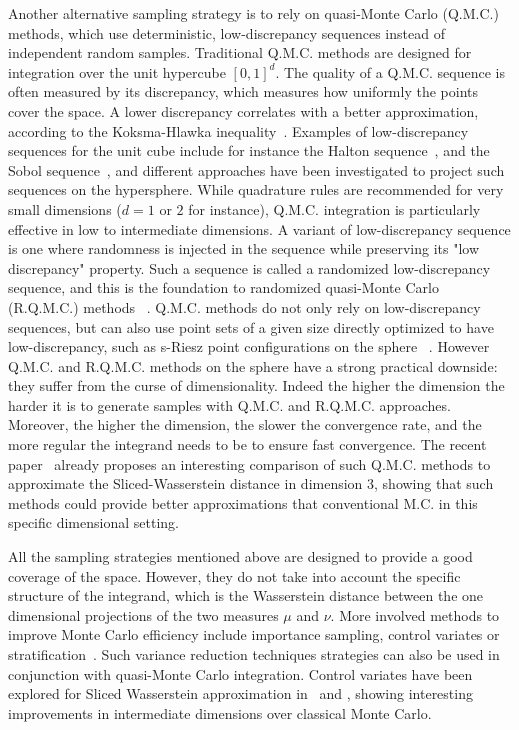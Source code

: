 Another alternative sampling strategy is to rely on quasi-Monte Carlo (Q.M.C.) methods, which use deterministic, low-discrepancy sequences instead of independent random samples. %
Traditional 
{Q.M.C.}
methods are designed for integration over the unit hypercube $[0, 1]^d$. The 
quality of a {Q.M.C.} sequence is often measured by its discrepancy, which 
measures how uniformly the points cover the space. A lower discrepancy 
correlates with a better approximation, according to the Koksma-Hlawka 
inequality~\citep{brandolini2013koksma}. Examples of low-discrepancy sequences 
for the unit cube include for instance the Halton 
sequence~\citep{halton1964algorithm},  and the Sobol 
sequence~\citep{sobol1967distribution}, and different approaches have been 
investigated to project such sequences on the hypersphere. While quadrature 
rules are recommended for very small dimensions ($d = 1$ or $2$ for instance), 
{Q.M.C.} integration is particularly effective in low to intermediate 
dimensions. A variant of low-discrepancy sequence is one where randomness is 
injected in the sequence while preserving its "low discrepancy" property. Such a 
sequence is called a randomized low-discrepancy sequence, and this is the 
foundation to randomized quasi-Monte Carlo
{(R.Q.M.C.)}
methods ~\citep{owen2019monte}.  
Q.M.C. methods do not only rely on low-discrepancy {sequences}, but can also use 
point sets of a given size directly optimized to have low-discrepancy, such as  
s-Riesz point configurations on the sphere ~\citep{GOTZ200362}. However {Q.M.C.} 
and {R.Q.M.C.} methods on the sphere have {a strong practical downside}: they 
suffer from the curse of dimensionality. Indeed the higher the dimension the 
harder it is to generate samples with {Q.M.C.} and {R.Q.M.C.} approaches. 
Moreover, the higher the dimension, the slower the convergence rate, and the 
more regular the integrand needs to be to ensure fast convergence. 
The recent paper~\citep{nguyen2024quasimonte} already proposes an interesting 
comparison of such {Q.M.C.} methods to approximate  
{the}
Sliced-Wasserstein 
{distance}
in dimension 3, showing that such methods could provide 
better approximations  that conventional {M.C.} in this specific dimensional 
setting. 

All the sampling strategies mentioned above are designed to provide a good coverage of the space. However, they do not take into account the specific structure of the integrand, which is the Wasserstein distance between the one dimensional projections of the two measures $\mu$ and $\nu$. More involved methods to improve Monte Carlo efficiency include importance sampling, control variates or stratification~\citep{asmussen2007stochastic}. Such variance reduction techniques strategies can also be used in conjunction with quasi-Monte Carlo integration.
Control variates have been explored for Sliced Wasserstein approximation in~\citep{Nguyen:2023aa} and \citep{leluc2024slicedwassersteinestimationsphericalharmonics}, showing interesting improvements in intermediate dimensions over classical Monte Carlo. 

